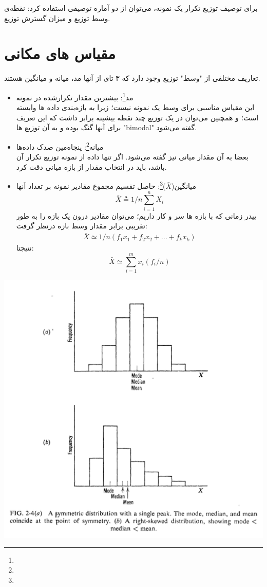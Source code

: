 \documentclass[12pt,onecolumn,a4paper]{article}
\begin{document}
برای توصیف توزیع تکرار یک نمونه، می‌توان از دو آماره توصیفی استفاده کرد: نقطه‌ی وسط توزیع و میزان گسترش توزیع.

\section{مقیاس های مکانی}
تعاریف مختلفی از "وسط" توزیع وجود دارد که ۳ تای از آنها مد، میانه و میانگین هستند.
\begin{itemize}
    \item مد\footnote{}: بیشترین مقدار تکرارشده در نمونه \\
        این مقیاس مناسبی برای وسط یک نمونه نیست؛ زیرا به بازه‌بندی داده ها وابسته است؛ و همچنین می‌توان در یک توزیع چند نقطه بیشینه برابر داشت که این تعریف برای آنها گنگ بوده و به آن توزیع ها "bimodal" گفته می‌شود.
    \item میانه\footnote{}: پنجاه‌مین صدک داده‌ها \\
        بعضا به آن مقدار میانی نیز گفته می‌شود. اگر تنها داده از نمونه توزیع تکرار آن باشد، باید در انتخاب مقدار از بازه میانی دقت کرد.
    \item میانگین($\bar{X}$)\footnote{}: حاصل تقسیم مجموع مقادیر نمونه بر تعداد آنها
        \begin{equation}
            \bar{X} \triangleq 1/n \sum_{i=1}^{n} X_i
        \end{equation}
        ییدر زمانی که با بازه ها سر و کار داریم؛ می‌توان مقادیر درون یک بازه را به طور تقریبی برابر مقدار وسط بازه درنظر گرفت:
        \begin{align*}
            \bar{X} \simeq 1/n(f_1 x_1 + f_2 x_2 + ... + f_k x_k) 
        \end{align*}
        نتیجتا:
        \begin{equation}
            \bar{X} \simeq \sum_{i=1}^{m} x_i(f_i/n)
        \end{equation}
\end{itemize}

\includegraphics[width=\textwidth]{fig3.png}
\end{document}
